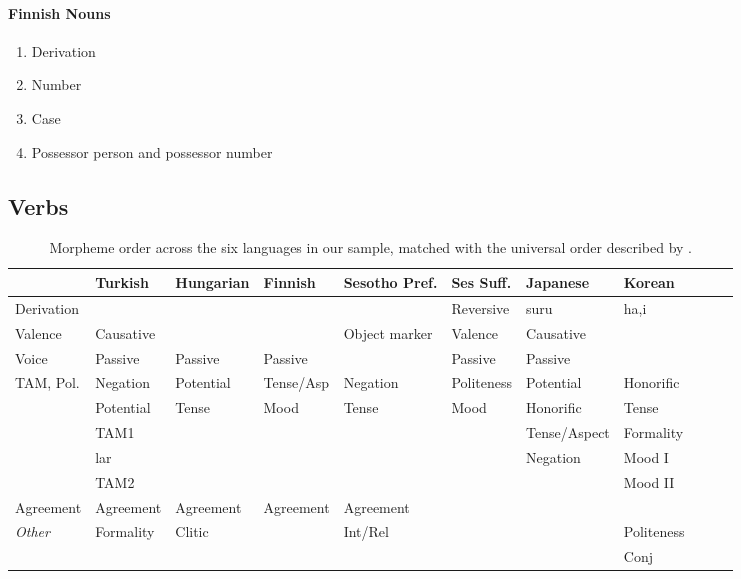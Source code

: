 \documentclass[11pt,letterpaper]{article}
\begin{document}
\paragraph{Finnish Nouns}
\begin{enumerate}
    \item Derivation
    \item Number
    \item Case 
    \item Possessor person and possessor number
\end{enumerate}

\subsection{Verbs}

\begin{table}[]
    \centering
\begin{tabular}{l||l|l|l|l|l|l|llll}
                    & Turkish & Hungarian & Finnish  & Sesotho Pref.     & Ses Suff. & Japanese & Korean\\ \hline\hline
Derivation          &  &         &          &               & Reversive & suru    & ha,i\\ \hline
Valence             &  Causative &         &           & Object marker & Valence & Causative\\ \hline
Voice               & Passive & Passive    & Passive     &               & Passive & Passive\\ \hline
TAM, Pol.           & Negation  &   Potential  &   Tense/Asp &    Negation &  Politeness &      Potential        & Honorific \\
                    & Potential & Tense        &    Mood     &     Tense   &    Mood     &   Honorific  &    Tense       \\
                    &   TAM1    &          &                &         &                  & Tense/Aspect & Formality \\
                    & lar       &          &           &  & & Negation & Mood I\\
                    & TAM2         &           &               &          &       &      &  Mood II \\ \hline
Agreement           & Agreement & Agreement & Agreement & Agreement \\ \hline
\textit{Other}               & Formality          & Clitic    &              & Int/Rel &      &        & Politeness \\
                    &           &     &              &  &          &    & Conj \\
\end{tabular}
    \caption{Morpheme order across the six languages in our sample, matched with the universal order described by \cite{bybee-morphology-1985}.}
    \label{tab:table-orders}
\end{table}
\end{document}
